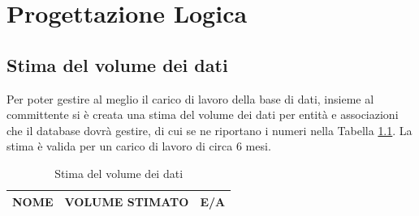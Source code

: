 \documentclass[12pt,a4paper]{report}
\begin{document}
\chapter{Progettazione Logica}
\section{Stima del volume dei dati}
Per poter gestire al meglio il carico di lavoro della base di dati, insieme al committente si è creata una stima del volume dei dati per entità e associazioni che il database dovrà gestire, di cui se ne riportano i numeri nella Tabella \ref{table:volumeDati}.
La stima è valida per un carico di lavoro di circa 6 mesi.

\begin{longtable}{|p{7.5cm}|r|c|}
\caption{Stima del volume dei dati}
\label{table:volumeDati}\\
\hline
\textbf{NOME} & \textbf{VOLUME STIMATO} & \textbf{E/A} \\
\hline
\endhead


\end{longtable}
\end{document}
